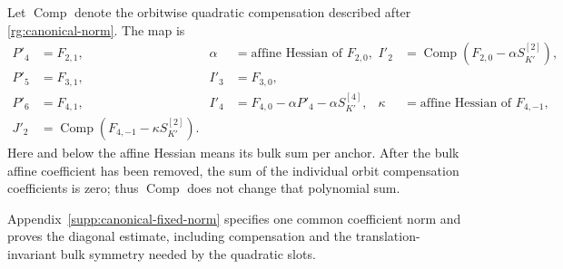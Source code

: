 Let $\operatorname{Comp}$ denote the orbitwise quadratic
compensation described after \eqref{rg:canonical-norm}.  The map is
\begin{align}
 P'_4&=F_{2,1},&
 \alpha&=\text{affine Hessian of }F_{2,0},&
 I'_2&=\operatorname{Comp}(F_{2,0}-\alpha S_{K'}^{[2]}),
 \nonumber\\
 P'_5&=F_{3,1},& I'_3&=F_{3,0},\nonumber\\
 P'_6&=F_{4,1},&
 I'_4&=F_{4,0}-\alpha P'_4-\alpha S_{K'}^{[4]},&
 \kappa&=\text{affine Hessian of }F_{4,-1},
 \nonumber\\
 J'_2&=\operatorname{Comp}(F_{4,-1}-\kappa S_{K'}^{[2]}).
 \label{rg:canonical-map}
\end{align}
Here and below the affine Hessian means its bulk sum per anchor.
After the bulk affine coefficient has been removed, the sum of the
individual orbit compensation coefficients is zero; thus
$\operatorname{Comp}$ does not change that polynomial sum.

Appendix~\ref{supp:canonical-fixed-norm} specifies one common coefficient
norm and proves the diagonal estimate, including compensation and the
translation-invariant bulk symmetry needed by the quadratic slots.

